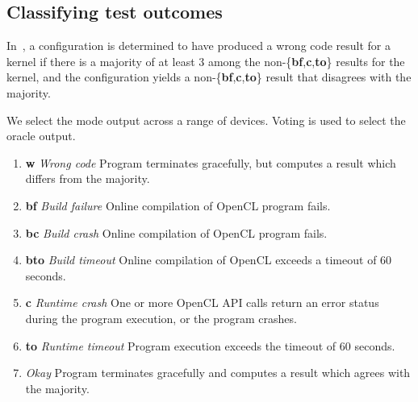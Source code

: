 \subsection{Classifying test outcomes}

In~\cite{Lidbury2015a}, a configuration is determined to have produced a wrong code result for a kernel if there is a majority of at least 3 among the non-\{\textbf{bf},\textbf{c},\textbf{to}\} results for the kernel, and the configuration yields a non-\{\textbf{bf},\textbf{c},\textbf{to}\} result that disagrees with the majority.

We select the mode output across a range of devices. Voting is used to select the oracle output.
%
\begin{enumerate}
	\item \textbf{w} \emph{Wrong code} Program terminates gracefully, but computes a result which differs from the majority.
	\item \textbf{bf} \emph{Build failure} Online compilation of OpenCL program fails.
	\item \textbf{bc} \emph{Build crash} Online compilation of OpenCL program fails.
	\item \textbf{bto} \emph{Build timeout} Online compilation of OpenCL exceeds a timeout of 60 seconds.
	\item \textbf{c} \emph{Runtime crash} One or more OpenCL API calls return an error status during the program execution, or the program crashes.
	\item \textbf{to} \emph{Runtime timeout} Program execution exceeds the timeout of 60 seconds.
	\item \textbf{\cmark} \emph{Okay} Program terminates gracefully and computes a result which agrees with the majority.
\end{enumerate}
